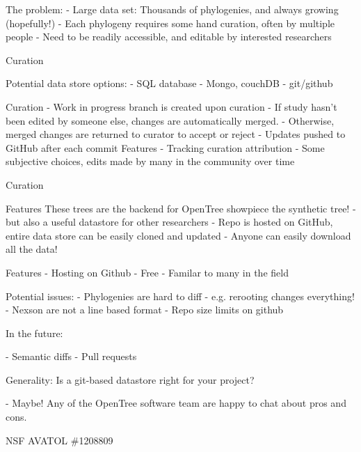 \documentclass[a4paper,10pt]{article}
\begin{document}
 The problem:
 - Large data set: Thousands of phylogenies, and always growing (hopefully!)
 - Each phylogeny requires some hand curation, often by multiple people
 - Need to be readily accessible, and editable by interested researchers

Curation

 Potential data store options:
 - SQL database
 - Mongo, couchDB
 - git/github

 Curation
- Work in progress branch is created upon curation  
- If study hasn't been edited by someone else, changes are automatically merged.  
- Otherwise, merged changes are returned to curator to accept or reject
- Updates pushed to GitHub after each commit
 Features
 - Tracking curation attribution  
- Some subjective choices, edits made by many in the community over time

 Curation

 Features
 These trees are the backend for OpenTree showpiece  
 the synthetic tree!
 - but also a useful datastore for other researchers
 - Repo is hosted on GitHub, entire data store can be easily cloned and updated
 - Anyone can easily download all the data!
 
 Features
- Hosting on Github
- Free  
- Familar to  many in the field


 Potential issues:
 - Phylogenies are hard to diff - e.g. rerooting changes everything!
 - Nexson are not a line based format
 - Repo size limits on github


 In the future:

 - Semantic diffs  
 - Pull requests
 
  
Generality:
Is a git-based datastore right for your project?

 - Maybe! Any of the OpenTree software team are happy to chat about pros and cons.

NSF AVATOL \#1208809  
\end{document}
